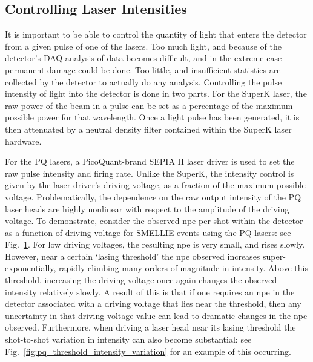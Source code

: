 \subsection{Controlling Laser Intensities}\label{sec:smellie_attenuators}
It is important to be able to control the quantity of light that enters the detector from a given pulse of one of the lasers. Too much light, and because of the detector's DAQ analysis of data becomes difficult, and in the extreme case permanent damage could be done. Too little, and insufficient statistics are collected by the detector to actually do any analysis. Controlling the pulse intensity of light into the detector is done in two parts. For the SuperK laser, the raw power of the beam in a pulse can be set as a percentage of the maximum possible power for that wavelength. Once a light pulse has been generated, it is then attenuated by a neutral density filter contained within the SuperK laser hardware.

For the PQ lasers, a PicoQuant-brand SEPIA II laser driver is used to set the raw pulse intensity and firing rate. Unlike the SuperK, the intensity control is given by the laser driver's driving voltage, as a fraction of the maximum possible voltage. Problematically, the dependence on the raw output intensity of the PQ laser heads are highly nonlinear with respect to the amplitude of the driving voltage. To demonstrate, consider the observed npe per shot within the detector as a function of driving voltage for SMELLIE events using the PQ lasers: see Fig.~\ref{fig:pq_old_intensity_dependence}. For low driving voltages, the resulting npe is very small, and rises slowly. However, near a certain `lasing threshold' the npe observed increases super-exponentially, rapidly climbing many orders of magnitude in intensity. Above this threshold, increasing the driving voltage once again changes the observed intensity relatively slowly. A result of this is that if one requires an npe in the detector associated with a driving voltage that lies near the threshold, then any uncertainty in that driving voltage value can lead to dramatic changes in the npe observed. Furthermore, when driving a laser head near its lasing threshold the shot-to-shot variation in intensity can also become substantial: see Fig.~\ref{fig:pq_threshold_intensity_variation} for an example of this occurring.

\begin{figure}
    \centering
    \caption[]{}
    \label{fig:pq_old_intensity_dependence}
\end{figure}

